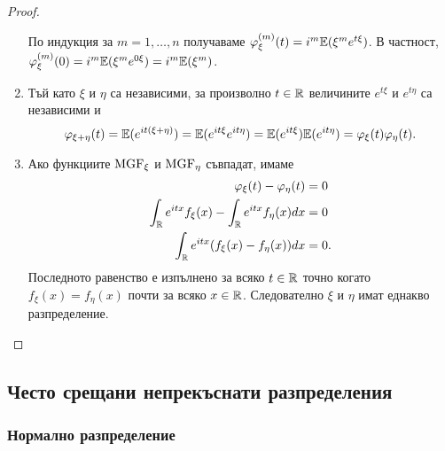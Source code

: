 \documentclass[numbers=endperiod, DIV=15, bibliography=totocnumbered]{scrartcl}
\begin{document}
\begin{proof}
\begin{enumerate}
    По индукция за $m = 1, \ldots, n$ получаваме $\varphi^{(m)}_\xi(t) = i^m \mathbb{E}(\xi^m e^{t \xi})$. В частност, $\varphi^{(m)}_\xi(0) = i^m \mathbb{E}(\xi^m e^{0 \xi}) = i^m \mathbb{E}(\xi^m)$.

    \item Тъй като $\xi$ и $\eta$ са независими, за произволно $t \in \mathbb{R}$ величините $e^{t\xi}$ и $e^{t\eta}$ са независими и
    \begin{displaymath}
      \varphi_{\xi + \eta}(t)
      =
      \mathbb{E}(e^{it(\xi + \eta)})
      =
      \mathbb{E}(e^{it\xi} e^{it\eta})
      =
      \mathbb{E}(e^{it\xi}) \mathbb{E}(e^{it\eta})
      =
      \varphi_\xi(t) \varphi_\eta(t).
    \end{displaymath}

    \item Ако функциите $\operatorname{MGF}_\xi$ и $\operatorname{MGF}_\eta$ съвпадат, имаме
    \begin{align*}
      \varphi_\xi(t) - \varphi_\eta(t) &= 0
      \\
      \int_{\mathbb{R}} e^{itx} f_\xi(x) - \int_{\mathbb{R}} e^{itx} f_\eta(x) dx &= 0
      \\
      \int_{\mathbb{R}} e^{itx} (f_\xi(x) - f_\eta(x)) dx &= 0.
    \end{align*}
    Последното равенство е изпълнено за всяко $t \in \mathbb{R}$ точно когато $f_\xi(x) = f_\eta(x)$ почти за всяко $x \in \mathbb{R}$. Следователно $\xi$ и $\eta$ имат еднакво разпределение.
  \end{enumerate}
\end{proof}

\subsection{Често срещани непрекъснати разпределения}

\subsubsection{Нормално разпределение}\label{dist:normal}
\end{document}
